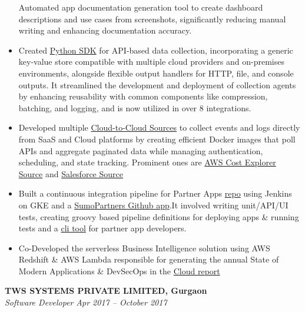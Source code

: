\documentclass[margin,line]{resume}
\begin{document}
\begin{resume}
\begin{itemize}
                \subitem Automated app documentation generation tool to create dashboard descriptions and use cases from screenshots, significantly reducing manual writing and enhancing documentation accuracy.
            \item Created \href{https://pypi.org/project/sumologic-appclient-sdk/}{Python SDK} for API-based data collection, incorporating a generic key-value store compatible with multiple cloud providers and on-premises environments, alongside flexible output handlers for HTTP, file, and console outputs. It streamlined the development and deployment of collection agents by enhancing reusability with common components like compression, batching, and logging, and is now utilized in over 8 integrations.
            \item Developed multiple \href{https://help.sumologic.com/docs/send-data/hosted-collectors/cloud-to-cloud-integration-framework/}{Cloud-to-Cloud Sources} to collect events and logs directly from SaaS and Cloud platforms by creating efficient Docker images that poll APIs and aggregate paginated data while managing authentication, scheduling, and state tracking. Prominent ones are
             \href{https://help.sumologic.com/docs/send-data/hosted-collectors/cloud-to-cloud-integration-framework/aws-cost-explorer-source/}{AWS Cost Explorer Source} and \href{https://help.sumologic.com/docs/send-data/hosted-collectors/cloud-to-cloud-integration-framework/salesforce-source/}{Salesforce Source}
            \item Built a continuous integration pipeline for Partner Apps \href{https://github.com/SumoLogic/sumologic-public-partner-apps}{repo} using Jenkins on GKE and a  \href{https://github.com/apps/sumopartners}{SumoPartners Github app}.It involved writing unit/API/UI tests, creating groovy based pipeline definitions for deploying apps \& running tests and a \href{https://pypi.org/project/sumologic-apptestutils/}{cli tool} for partner app developers.
            \item Co-Developed the serverless Business Intelligence solution  using AWS Redshift \& AWS Lambda responsible for generating the annual State of Modern Applications \& DevSecOps in the \href{https://www.sumologic.com/brief/state-modern-apps-report/}{Cloud report}
        \end{itemize}
    \textbf{TWS SYSTEMS PRIVATE LIMITED, Gurgaon}\\
           \textsl{Software Developer} \hfill \textsl{Apr 2017 -- October 2017} \vspace{1mm}%
    \begin{itemize}


\end{itemize}
\end{resume}
\end{document}

